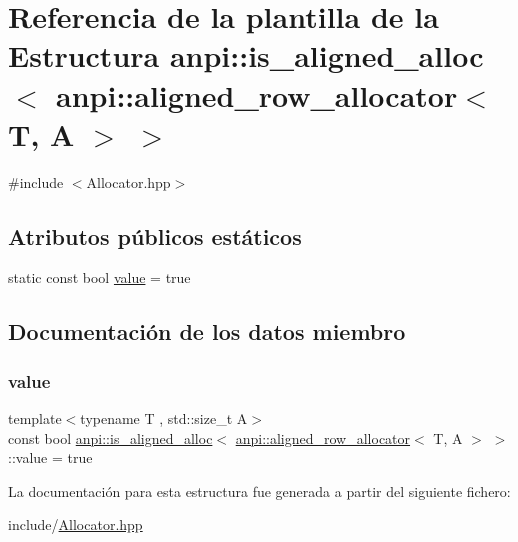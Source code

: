 \hypertarget{structanpi_1_1is__aligned__alloc_3_01anpi_1_1aligned__row__allocator_3_01T_00_01A_01_4_01_4}{}\section{Referencia de la plantilla de la Estructura anpi\+:\+:is\+\_\+aligned\+\_\+alloc$<$ anpi\+:\+:aligned\+\_\+row\+\_\+allocator$<$ T, A $>$ $>$}
\label{structanpi_1_1is__aligned__alloc_3_01anpi_1_1aligned__row__allocator_3_01T_00_01A_01_4_01_4}


{\ttfamily \#include $<$Allocator.\+hpp$>$}

\subsection*{Atributos públicos estáticos}
\begin{DoxyCompactItemize}
\item 
static const bool \hyperlink{structanpi_1_1is__aligned__alloc_3_01anpi_1_1aligned__row__allocator_3_01T_00_01A_01_4_01_4_af72b7fab4349e32a8889283212cd863f}{value} = true
\end{DoxyCompactItemize}


\subsection{Documentación de los datos miembro}
\mbox{\label{structanpi_1_1is__aligned__alloc_3_01anpi_1_1aligned__row__allocator_3_01T_00_01A_01_4_01_4_af72b7fab4349e32a8889283212cd863f}} 
\subsubsection{\texorpdfstring{value}{value}}
{\footnotesize\ttfamily template$<$typename T , std\+::size\+\_\+t A$>$ \\
const bool \hyperlink{structanpi_1_1is__aligned__alloc}{anpi\+::is\+\_\+aligned\+\_\+alloc}$<$ \hyperlink{classanpi_1_1aligned__row__allocator}{anpi\+::aligned\+\_\+row\+\_\+allocator}$<$ T, A $>$ $>$\+::value = true\hspace{0.3cm}{\ttfamily [static]}}



La documentación para esta estructura fue generada a partir del siguiente fichero\+:\begin{DoxyCompactItemize}
\item 
include/\hyperlink{Allocator_8hpp}{Allocator.\+hpp}\end{DoxyCompactItemize}
